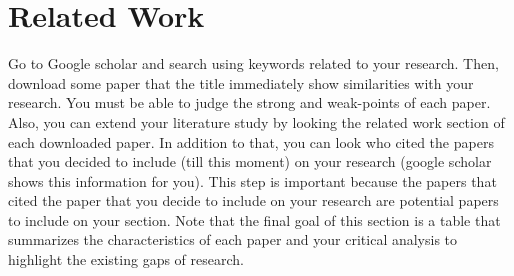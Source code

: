 \section{Related Work}

Go to Google scholar and search using keywords related to your research. Then,
download some paper that the title immediately show similarities with your
research. You must be able to judge the strong and weak-points of each paper.
Also, you can extend your literature study by looking the related work section
of each downloaded paper. In addition to that, you can look who cited the papers
that you decided to include (till this moment) on your research (google scholar
shows this information for you). This step is important because the papers that
cited the paper that you decide to include on your research are potential papers
to include on your section. Note that the final goal of this section is a table
that summarizes the characteristics of each paper and your critical analysis to
highlight the existing gaps of research.
